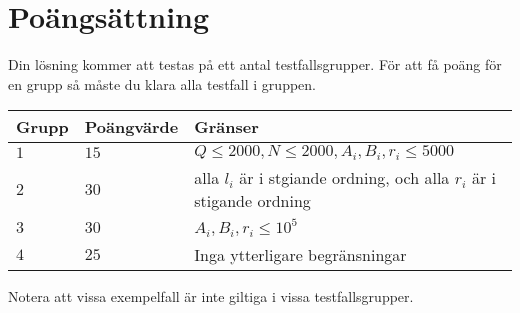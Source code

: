 \section*{Poängsättning}
Din lösning kommer att testas på ett antal testfallsgrupper.
För att få poäng för en grupp så måste du klara alla testfall i gruppen.

\noindent
\begin{tabular}{| l | l | l |}
  \hline
  Grupp & Poängvärde & Gränser \\ \hline
  $1$   & $15$        & $Q \le 2000, N \leq 2000, A_i,B_i,r_i \leq 5000$ \\ \hline
  $2$   & $30$       & alla $l_i$ är i stgiande ordning, och alla $r_i$ är i stigande ordning \\ \hline
  $3$   & $30$       & $ A_i,B_i,r_i \leq 10^5$ \\ \hline
  $4$   & $25$       & Inga ytterligare begränsningar \\ \hline
\end{tabular}

Notera att vissa exempelfall är inte giltiga i vissa testfallsgrupper.

